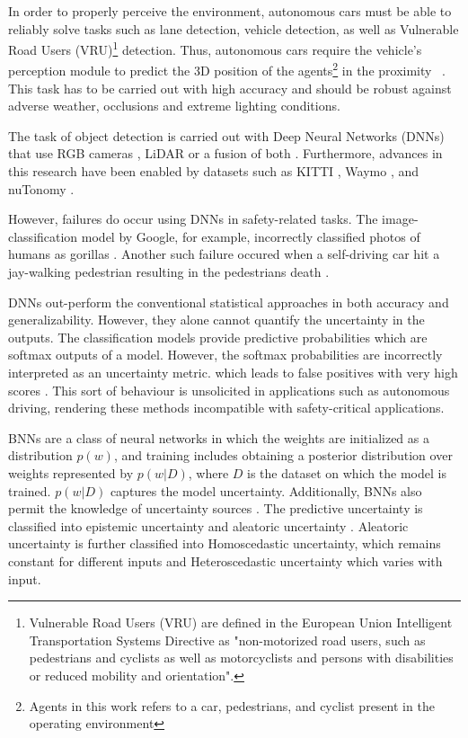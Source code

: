 \documentclass[10pt,twocolumn,letterpaper]{article}
\begin{document}
In order to properly perceive the environment, autonomous cars must be able to reliably solve tasks such as lane detection, vehicle detection, as well as Vulnerable Road Users (VRU)\footnote{Vulnerable Road Users (VRU) are defined in the European Union Intelligent Transportation Systems Directive as "non-motorized road users, such as pedestrians and cyclists as well as motorcyclists and persons with disabilities or reduced mobility and orientation".} detection. Thus, autonomous cars require the vehicle's perception module to predict the 3D position of the agents\footnote{Agents in this work refers to a car, pedestrians, and cyclist present in the operating environment} in the proximity ~\cite{KITTI2012}. This task has to be carried out with high accuracy and should be robust against adverse weather, occlusions and extreme lighting conditions. 

The task of object detection is carried out with Deep Neural Networks (DNNs) \cite{Rao2018, Arnold2019} that use RGB cameras \cite{Chen2016, Mousavian2017, Chabot2017, Chen2017}, LiDAR \cite{VOTE3DEEP2017, Zhou2018, Sahba2019, Simon2018, Xiang2015} or a fusion of both \cite{Du2018, FPointnet2018, AVOD2018, FrustumConvnet2019}. Furthermore, advances in this research have been enabled by datasets such as KITTI \cite{KITTI2012}, Waymo \cite{Waymo2019}, and nuTonomy \cite{Caesar2020}.

However, failures do occur using DNNs in safety-related tasks. \label{GoogleFailure} The image-classification model by Google, for example, incorrectly classified photos of humans as gorillas \cite{Mulshine2015}. Another such failure occured \label{Uberfailure} when a self-driving car hit a jay-walking pedestrian resulting in the pedestrians death \cite{SLJCW2018}.

DNNs out-perform the conventional statistical approaches in both accuracy and generalizability. However, they alone cannot quantify the uncertainty in the outputs. The classification models provide predictive probabilities which are softmax outputs of a model. However, the softmax probabilities are incorrectly interpreted as an uncertainty metric. which leads to false positives with very high scores \cite{Blundell2015, Malinin2018}. This sort of behaviour is unsolicited in applications such as autonomous driving, rendering these methods incompatible with safety-critical applications. 

BNNs \cite{tran2016edward, Shridhar2018, Tran2019} are a class of neural networks in which the weights are initialized as a distribution $p(w)$, and training includes obtaining a posterior distribution over weights represented by $p (w|D)$, where $D$ is the dataset on which the model is trained. $p (w|D)$ captures the model uncertainty. Additionally, BNNs also permit the knowledge of uncertainty sources \cite{Henne2020}. The predictive uncertainty is classified into epistemic uncertainty and aleatoric uncertainty \cite{Kendall2017}. Aleatoric uncertainty is further classified into Homoscedastic uncertainty, which remains constant for different inputs and Heteroscedastic uncertainty which varies with input.
\end{document}
